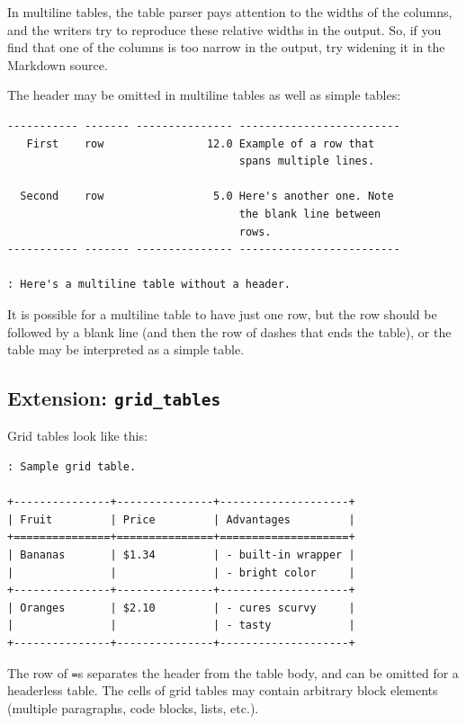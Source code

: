 \documentclass[
  b5paper
]{book}
\begin{document}
In multiline tables, the table parser pays attention to the widths of
the columns, and the writers try to reproduce these relative widths in
the output. So, if you find that one of the columns is too narrow in the
output, try widening it in the Markdown source.

The header may be omitted in multiline tables as well as simple tables:

\begin{verbatim}
----------- ------- --------------- -------------------------
   First    row                12.0 Example of a row that
                                    spans multiple lines.

  Second    row                 5.0 Here's another one. Note
                                    the blank line between
                                    rows.
----------- ------- --------------- -------------------------

: Here's a multiline table without a header.
\end{verbatim}

It is possible for a multiline table to have just one row, but the row
should be followed by a blank line (and then the row of dashes that ends
the table), or the table may be interpreted as a simple table.

\subsection{\texorpdfstring{Extension:
\texttt{grid\_tables}}{Extension: grid\_tables}}\label{extension-grid_tables}

Grid tables look like this:

\begin{verbatim}
: Sample grid table.

+---------------+---------------+--------------------+
| Fruit         | Price         | Advantages         |
+===============+===============+====================+
| Bananas       | $1.34         | - built-in wrapper |
|               |               | - bright color     |
+---------------+---------------+--------------------+
| Oranges       | $2.10         | - cures scurvy     |
|               |               | - tasty            |
+---------------+---------------+--------------------+
\end{verbatim}

The row of \texttt{=}s separates the header from the table body, and can
be omitted for a headerless table. The cells of grid tables may contain
arbitrary block elements (multiple paragraphs, code blocks, lists,
etc.).
\end{document}
